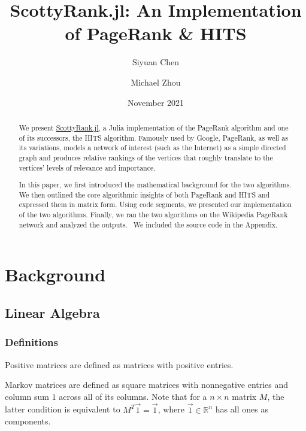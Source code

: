 \documentclass[12pt, titlepage, twoside]{amsart}
\newcommand{\R}{\ensuremath{\mathbb R}}
\begin{document}
\title[ScottyRank.jl]{ScottyRank.jl: An Implementation of PageRank \& HITS}

\author{Siyuan Chen}
\author{Michael Zhou}
\date{November 2021}

\begin{abstract}
We present \href{https://github.com/mzhou08/ScottyRank.jl}{ScottyRank.jl},
a Julia implementation of the PageRank algorithm and one of its successors, the HITS algorithm.
Famously used by Google, PageRank, as well as its variations,
models a network of interest (such as the Internet) as a simple directed graph and produces relative rankings
of the vertices that roughly translate to the vertices’ levels of relevance and importance.

In this paper, we first introduced the mathematical background for the two algorithms.
We then outlined the core algorithmic insights of both PageRank and HITS and expressed them in matrix form.
Using code segments, we presented our implementation of the two algorithms.
Finally, we ran the two algorithms on the Wikipedia PageRank network and analyzed the outputs.~\cite{pagerank}
We included the source code in the Appendix.
\end{abstract}

\maketitle

\tableofcontents

\clearpage

\section{Background}

\subsection{Linear Algebra}

\subsubsection{Definitions}

Positive matrices are defined as matrices with positive entries.

Markov matrices are defined as square matrices with nonnegative entries and column sum $1$ across all of its columns.
Note that for a $n\times n$ matrix $M$, the latter condition is equivalent to $M^T\vec{1} = \vec{1}$,
where $\vec{1}\in\R^n$ has all ones as components.
\end{document}
